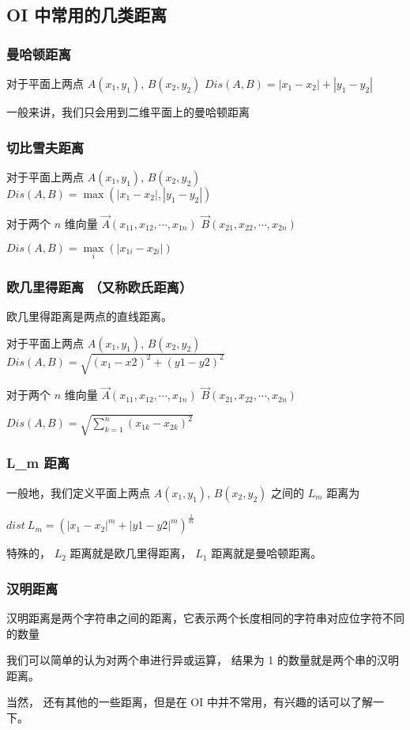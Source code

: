 
\subsection{OI 中常用的几类距离}

\subsubsection{曼哈顿距离}

对于平面上两点 $A(x_1, y_1)$, $B(x_2, y_2)$ $Dis(A, B) = |x_1-x_2| + |y_1-y_2|$

一般来讲，我们只会用到二维平面上的曼哈顿距离

\subsubsection{切比雪夫距离}

对于平面上两点 $A(x_1, y_1)$, $B(x_2, y_2)$ $Dis(A, B) = \max(|x_1-x_2| , |y_1-y_2|)$

对于两个 $n$ 维向量 $\vec A(x_{11}, x_{12}, \cdots,x_{1n})$  $\vec B(x_{21}, x_{22}, \cdots,x_{2n})$

$Dis(A, B) = \max\limits_i(|x_{1i}-x_{2i}|)$

\subsubsection{欧几里得距离 （又称欧氏距离）}

欧几里得距离是两点的直线距离。

对于平面上两点 $A(x_1, y_1)$, $B(x_2, y_2)$ $Dis(A, B) = \sqrt{(x_1-x2)^2+(y1-y2)^2}$

对于两个 $n$ 维向量 $\vec A(x_{11}, x_{12}, \cdots,x_{1n})$  $\vec B(x_{21}, x_{22}, \cdots,x_{2n})$

$Dis(A, B) = \sqrt{\sum\limits_{k=1}^n(x_{1k}-x_{2k})^2}$

\subsubsection{L\_m 距离}

一般地，我们定义平面上两点 $A(x_1, y_1)$, $B(x_2, y_2)$ 之间的 $L_m$ 距离为

$dist~L_m = (|x_1-x_2|^m+|y1-y2|^m)^{\frac{1}{m}}$

特殊的， $L_2$ 距离就是欧几里得距离， $L_1$ 距离就是曼哈顿距离。

\subsubsection{汉明距离}

汉明距离是两个字符串之间的距离，它表示两个长度相同的字符串对应位字符不同的数量

我们可以简单的认为对两个串进行异或运算， 结果为 1 的数量就是两个串的汉明距离。

\hr

当然， 还有其他的一些距离，但是在 OI 中并不常用，有兴趣的话可以了解一下。
